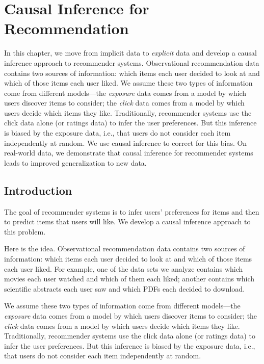 

\chapter{Causal Inference for Recommendation} \label{chpt:causal_rec}

In this chapter, we move from implicit data to \textit{explicit} data and develop a causal inference approach to recommender systems.
Observational recommendation data contains two sources of
information: which items each user decided to look at and which of
those items each user liked.  We assume these two types of
information come from different models---the \textit{exposure} data
comes from a model by which users discover items to consider; the
\textit{click} data comes from a model by which users decide which
items they like.  Traditionally, recommender systems use the
click data alone (or ratings data) to infer the user preferences.
But this inference is biased by the exposure data, i.e., that users
do not consider each item independently at random.  We use causal
inference to correct for this bias. On real-world data, we
demonstrate that causal inference for recommender systems leads
to improved generalization to new data.


\section{Introduction}

The goal of recommender systems is to infer users' preferences for
items and then to predict items that users will like. We develop a
causal inference approach to this problem.

Here is the idea. Observational recommendation data contains two
sources of information: which items each user decided to look at and
which of those items each user liked. For example, one of the data
sets we analyze contains which movies each user watched and which of
them each liked; another contains which scientific abstracts each user
saw and which PDFs each decided to download.

We assume these two types of information come from different
models---the \textit{exposure} data comes from a model by which users
discover items to consider; the \textit{click} data comes from a model
by which users decide which items they like. Traditionally,
recommender systems use the click data alone (or ratings data) to
infer the user preferences. But this inference is biased by the
exposure data, i.e., that users do not consider each item
independently at random.

